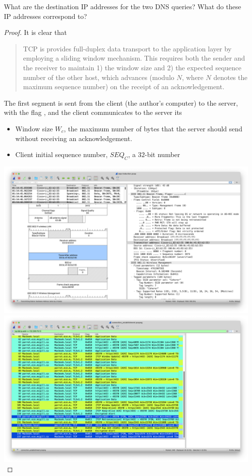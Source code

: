 \documentclass[../../main.tex]{subfiles}
\begin{document}
\begin{wts}
What are the destination IP addresses for the two DNS queries? What do these IP addresses correspond to?
\end{wts}
\begin{proof}
It is clear that
\begin{quote}
    TCP is provides full-duplex data transport to the application layer by employing a sliding window mechanism. This requires both the sender and the receiver to maintain 1) the window size and 2) the expected sequence number of the other host, which advances (modulo $N$, where $N$ denotes the maximum sequence number) on the receipt of an acknowledgement.
\end{quote}
The first segment is sent from the client (the author’s computer) to the server, with the flag , and the client communicates to the server its
\begin{itemize}
    \item Window size $W_c$, the maximum number of bytes that the server should send without receiving an acknowledgement.
    \item Client initial sequence number, ${SEQ}_C$, a $32$-bit number 
\end{itemize}
\includegraphics[width=\textwidth]{subfiles/images/PART2_Beacon_Frame.png}
\includegraphics[width=\textwidth]{subfiles/images/CONNECTION_TERMINATION_Q16.png}
\end{proof}
\end{document}
